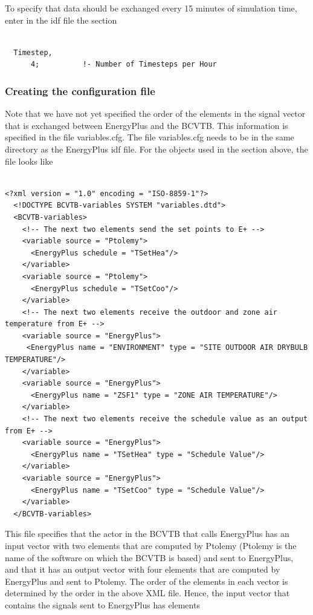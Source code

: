 To specify that data should be exchanged every 15 minutes of simulation time, enter in the idf file the section

\begin{lstlisting}

  Timestep,
      4;          !- Number of Timesteps per Hour
\end{lstlisting}

\subsubsection{Creating the configuration file}\label{creating-the-configuration-file}

Note that we have not yet specified the order of the elements in the signal vector that is exchanged between EnergyPlus and the BCVTB. This information is specified in the file variables.cfg. The file variables.cfg needs to be in the same directory as the EnergyPlus idf file. For the objects used in the section above, the file looks like

\begin{lstlisting}

<?xml version = "1.0" encoding = "ISO-8859-1"?>
  <!DOCTYPE BCVTB-variables SYSTEM "variables.dtd">
  <BCVTB-variables>
    <!-- The next two elements send the set points to E+ -->
    <variable source = "Ptolemy">
      <EnergyPlus schedule = "TSetHea"/>
    </variable>
    <variable source = "Ptolemy">
      <EnergyPlus schedule = "TSetCoo"/>
    </variable>
    <!-- The next two elements receive the outdoor and zone air temperature from E+ -->
    <variable source = "EnergyPlus">
     <EnergyPlus name = "ENVIRONMENT" type = "SITE OUTDOOR AIR DRYBULB TEMPERATURE"/>
    </variable>
    <variable source = "EnergyPlus">
      <EnergyPlus name = "ZSF1" type = "ZONE AIR TEMPERATURE"/>
    </variable>
    <!-- The next two elements receive the schedule value as an output from E+ -->
    <variable source = "EnergyPlus">
      <EnergyPlus name = "TSetHea" type = "Schedule Value"/>
    </variable>
    <variable source = "EnergyPlus">
      <EnergyPlus name = "TSetCoo" type = "Schedule Value"/>
    </variable>
  </BCVTB-variables>
\end{lstlisting}

This file specifies that the actor in the BCVTB that calls EnergyPlus has an input vector with two elements that are computed by Ptolemy (Ptolemy is the name of the software on which the BCVTB is based) and sent to EnergyPlus, and that it has an output vector with four elements that are computed by EnergyPlus and sent to Ptolemy. The order of the elements in each vector is determined by the order in the above XML file. Hence, the input vector that contains the signals sent to EnergyPlus has elements

